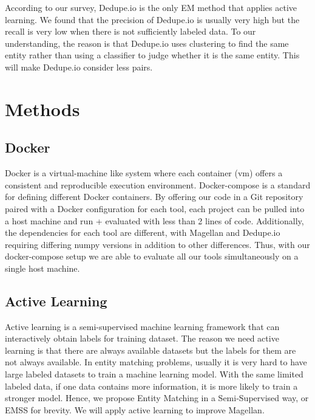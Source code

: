 \documentclass[letterpaper,twocolumn,10pt]{article}
\begin{document}
According to our survey, Dedupe.io is the only EM method that applies active learning. We found that the precision of Dedupe.io is usually very high but the recall is very low when there is not sufficiently labeled data. To our understanding, the reason is that Dedupe.io uses clustering to find the same entity rather than using a classifier to judge whether it is the same entity. This will make Dedupe.io consider less pairs. 

\section{Methods}

\subsection{Docker}
Docker is a virtual-machine like system where each container (vm) offers a consistent and reproducible execution environment. Docker-compose is a standard for defining different Docker containers. By offering our code in a Git repository paired with a Docker configuration for each tool, each project can be pulled into a host machine and run + evaluated with less than 2 lines of code. Additionally, the dependencies for each tool are different, with  Magellan and Dedupe.io requiring differing numpy versions in addition to other differences. Thus, with our docker-compose setup we are able to evaluate all our tools simultaneously on a single host machine.

\subsection{Active Learning}
Active learning is a semi-supervised machine learning framework that can interactively obtain labels for training dataset. The reason we need active learning is that there are always available datasets but the labels for them are not always available. In entity matching problems, usually it is very hard to have large labeled datasets to train a machine learning model. With the same limited labeled data, if one data contains more information, it is more likely to train a stronger model. Hence, we propose Entity Matching in a Semi-Supervised way, or EMSS for brevity. We will apply active learning to improve Magellan. 
\end{document}
